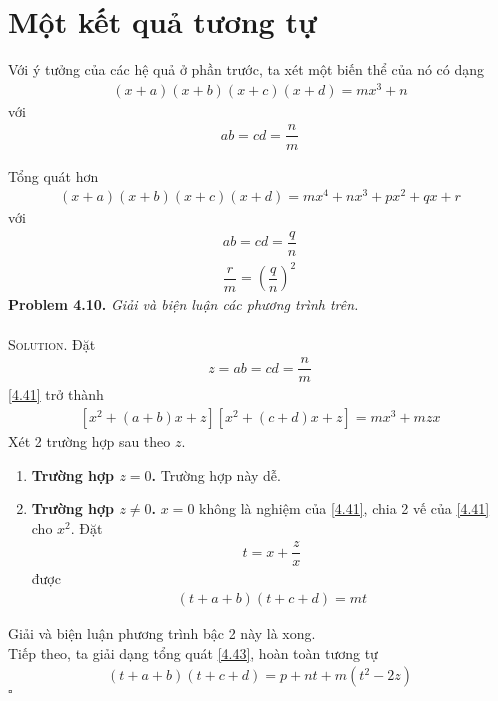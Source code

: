 \documentclass[a4paper,oneside]{book}
\numberwithin{equation}{chapter}
\begin{document}
\section{Một kết quả tương tự}
Với ý tưởng của các hệ quả ở phần trước, ta xét một biến thể của nó có dạng
\begin{align}
\label{4.41}
\left( {x + a} \right)\left( {x + b} \right)\left( {x + c} \right)\left( {x + d} \right) = m{x^3} + n
\end{align}
với 
\begin{align}
ab = cd = \dfrac{n}{m}
\end{align}

Tổng quát hơn 
\begin{align}
\label{4.43}
\left( {x + a} \right)\left( {x + b} \right)\left( {x + c} \right)\left( {x + d} \right) = m{x^4} + n{x^3} + p{x^2} + qx + r
\end{align}
với 
\begin{align}
ab = cd = \dfrac{q}{n}\\
\dfrac{r}{m} = {\left( {\dfrac{q}{n}} \right)^2}
\end{align}
\textbf{Problem 4.10.} \textit{Giải và biện luận các phương trình trên.}\\
\\
\textsc{Solution.} Đặt 
\begin{align}
z = ab = cd = \dfrac{n}{m}
\end{align}
\eqref{4.41} trở thành
\begin{align}
\left[ {{x^2} + \left( {a + b} \right)x + z} \right]\left[ {{x^2} + \left( {c + d} \right)x + z} \right] = m{x^3} + mzx
\end{align}
Xét 2 trường hợp sau theo $z$.
\begin{enumerate}
\item \textbf{Trường hợp $z=0$.} Trường hợp này dễ.
\item \textbf{Trường hợp $z \ne 0$.} $x=0$ không là nghiệm của \eqref{4.41}, chia 2 vế của \eqref{4.41} cho ${x^2}$. Đặt 
\begin{align}
t = x + \dfrac{z}{x}
\end{align}
được 
\begin{align}
\left( {t + a + b} \right)\left( {t + c + d} \right) = mt
\end{align}
\end{enumerate}
Giải và biện luận phương trình bậc 2 này là xong.\\

Tiếp theo, ta giải dạng tổng quát \eqref{4.43}, hoàn toàn tương tự
\begin{align}
\left( {t + a + b} \right)\left( {t + c + d} \right) = p + nt + m\left( {{t^2} - 2z} \right)
\end{align}
\hfill $\square$
\end{document}
